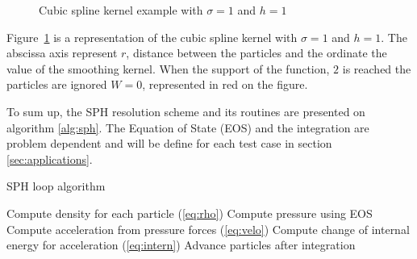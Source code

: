 \begin{figure}[t!]
\centering
{}
\caption{Cubic spline kernel example with $\sigma = 1$ and $h = 1$}
\label{fig:cubic_spline_function}
\end{figure}

Figure~\ref{fig:cubic_spline_function} is a representation of the cubic spline kernel with $\sigma = 1$ and $h = 1$. 
The abscissa axis represent $r$, distance between the particles and the ordinate the value of the smoothing kernel.
When the support of the function, $2$ is reached the particles are ignored $W=0$, represented in red on the figure. 

To sum up, the SPH resolution scheme and its routines are presented on algorithm \ref{alg:sph}.
The Equation of State (EOS) and the integration are problem dependent and will be define for each test case in section \ref{sec:applications}. 

\begin{algorithm}
\caption{SPH loop algorithm}\label{alg:sph}
\begin{algorithmic}[1]
\State Compute density for each particle (\ref{eq:rho})
\State Compute pressure using EOS 
\State Compute acceleration from pressure forces (\ref{eq:velo})
\State Compute change of internal energy for acceleration (\ref{eq:intern})
\State Advance particles after integration
\EndWhile
\end{algorithmic}
\end{algorithm}


